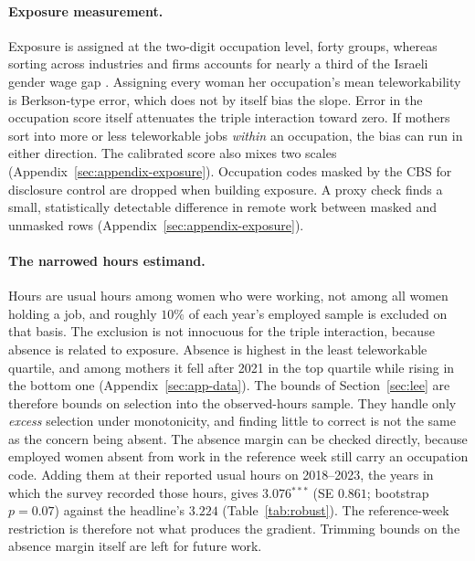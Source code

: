 \documentclass[12pt,a4paper]{article}
\newcommand{\sym}[1]{\ensuremath{^{#1}}}
\begin{document}
\paragraph{Exposure measurement.}
Exposure is assigned at the two-digit occupation level, forty groups, whereas sorting across
industries and firms accounts for nearly a third of the Israeli gender wage gap
\citep{buzaglo2023}. Assigning every woman her occupation's mean teleworkability is Berkson-type
error, which does not by itself bias the slope. Error in the occupation score itself attenuates
the triple interaction toward zero. If mothers sort into more or less teleworkable jobs
\emph{within} an occupation, the bias can run in either direction. The calibrated score also
mixes two scales (Appendix~\ref{sec:appendix-exposure}). Occupation codes masked by the CBS for
disclosure control are dropped when building exposure. A proxy check finds a small,
statistically detectable difference in remote work between masked and unmasked rows
(Appendix~\ref{sec:appendix-exposure}).

\paragraph{The narrowed hours estimand.}
Hours are usual hours among women who were working, not among all women holding a job, and
roughly $10\%$ of each year's employed sample is excluded on that basis. The exclusion is not
innocuous for the triple interaction, because absence is related to exposure. Absence is highest
in the least teleworkable quartile, and among mothers it fell after 2021 in the top quartile
while rising in the bottom one (Appendix~\ref{sec:app-data}). The bounds of Section~\ref{sec:lee}
are therefore bounds on selection into the observed-hours sample. They handle only \emph{excess}
selection under monotonicity, and finding little to correct is not the same as the concern being
absent. The absence margin can be checked directly, because employed women absent from work in
the reference week still carry an occupation code. Adding them at their reported usual hours on
2018--2023, the years in which the survey recorded those hours, gives $3.076$\sym{***} (SE
$0.861$; bootstrap $p = 0.07$) against the headline's $3.224$ (Table~\ref{tab:robust}). The
reference-week restriction is therefore not what produces the gradient. Trimming bounds on the
absence margin itself are left for future work.
\end{document}
